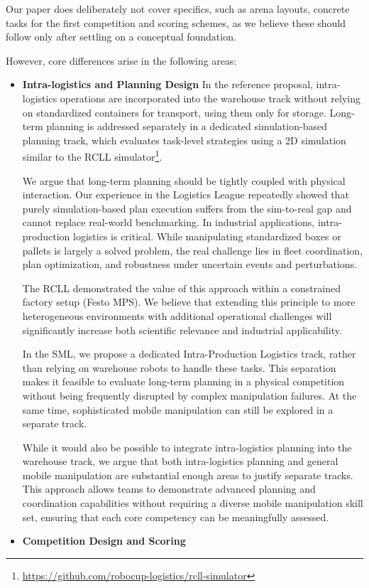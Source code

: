 \documentclass[letterpaper, 11pt]{extarticle}
\begin{document}
Our paper does deliberately not cover specifics, such as arena layouts, concrete tasks for the first competition and scoring schemes, as we believe these should follow only after settling on a conceptual foundation.

However, core differences arise in the following areas:
\begin{itemize}
\item \textbf{Intra-logistics and Planning Design}
In the reference proposal, intra-logistics operations are incorporated into the warehouse track without relying on standardized containers for transport, using them only for storage. Long-term planning is addressed separately in a dedicated simulation-based planning track, which evaluates task-level strategies using a 2D simulation similar to the RCLL simulator\footnote{\url{https://github.com/robocup-logistics/rcll-simulator}}.  

We argue that long-term planning should be tightly coupled with physical interaction. Our experience in the Logistics League repeatedly showed that purely simulation-based plan execution suffers from the sim-to-real gap and cannot replace real-world benchmarking. In industrial applications, intra-production logistics is critical. While manipulating standardized boxes or pallets is largely a solved problem, the real challenge lies in fleet coordination, plan optimization, and robustness under uncertain events and perturbations.  

The RCLL demonstrated the value of this approach within a constrained factory setup (Festo MPS).
We believe that extending this principle to more heterogeneous environments with additional operational challenges will significantly increase both scientific relevance and industrial applicability.

In the SML, we propose a dedicated Intra-Production Logistics track, rather than relying on warehouse robots to handle these tasks. This separation makes it feasible to evaluate long-term planning in a physical competition without being frequently disrupted by complex manipulation failures.
At the same time, sophisticated mobile manipulation can still be explored in a separate track.

While it would also be possible to integrate intra-logistics planning into the warehouse track, we argue that both intra-logistics planning and general mobile manipulation are substantial enough areas to justify separate tracks.
This approach allows teams to demonstrate advanced planning and coordination capabilities without requiring a diverse mobile manipulation skill set, ensuring that each core competency can be meaningfully assessed.
\item \textbf{Competition Design and Scoring}


\end{itemize}
\end{document}
